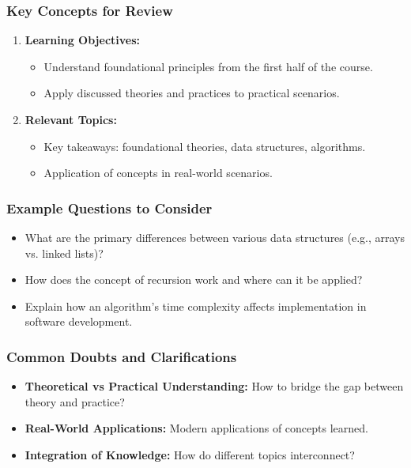 \documentclass[aspectratio=169]{beamer}
\begin{document}
\begin{frame}[fragile]
    \frametitle{Key Concepts for Review}
    \begin{enumerate}
        \item \textbf{Learning Objectives:} 
            \begin{itemize}
                \item Understand foundational principles from the first half of the course.
                \item Apply discussed theories and practices to practical scenarios.
            \end{itemize}
            
        \item \textbf{Relevant Topics:}
            \begin{itemize}
                \item Key takeaways: foundational theories, data structures, algorithms.
                \item Application of concepts in real-world scenarios.
            \end{itemize}
    \end{enumerate}
\end{frame}

\begin{frame}[fragile]
    \frametitle{Example Questions to Consider}
    \begin{itemize}
        \item What are the primary differences between various data structures (e.g., arrays vs. linked lists)?
        \item How does the concept of recursion work and where can it be applied?
        \item Explain how an algorithm's time complexity affects implementation in software development.
    \end{itemize}
\end{frame}

\begin{frame}[fragile]
    \frametitle{Common Doubts and Clarifications}
    \begin{itemize}
        \item \textbf{Theoretical vs Practical Understanding:} 
          How to bridge the gap between theory and practice?
        \item \textbf{Real-World Applications:} 
          Modern applications of concepts learned.
        \item \textbf{Integration of Knowledge:} 
          How do different topics interconnect?
    \end{itemize}
\end{frame}
\end{document}
